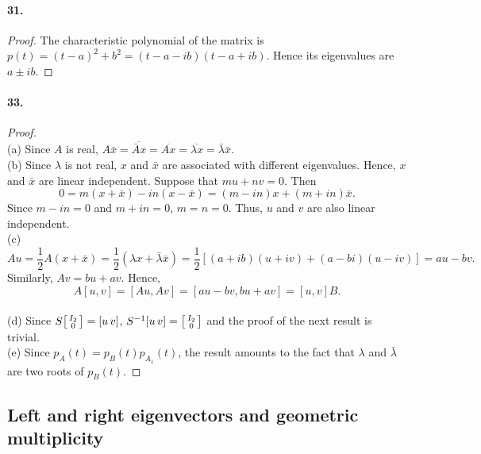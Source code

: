   \paragraph{31.}
  \begin{proof}
    The characteristic polynomial of the matrix is $p(t)=(t-a)^2+b^2=
    (t-a-ib)(t-a+ib)$. Hence its eigenvalues are $a\pm ib$.
  \end{proof}

  \paragraph{33.}
  \begin{proof}
    $\,$\\
    (a) Since $A$ is real, $A\bar{x} = \overline{\bar{A}x} = \overline{Ax} = 
    \overline{\lambda x} = \bar{\lambda}\bar{x}$.\\
    (b) Since $\lambda$ is not real, $x$ and $\bar{x}$ are associated with
    different eigenvalues. Hence, $x$ and $\bar{x}$ are linear independent.
    Suppose that $mu+nv=0$. Then
    \[
      0= m(x+\bar{x})-in(x-\bar{x}) = (m-in)x + (m+in)\bar{x}.
    \]
    Since $m-in=0$ and $m+in=0$, $m=n=0$. Thus, $u$ and $v$ are also linear 
    independent.\\
    (c) 
    \[
      Au = \frac{1}{2}A(x+\bar{x})=\frac{1}{2}(\lambda x+\bar{\lambda}\bar{x})
      = \frac{1}{2}[(a+ib)(u+iv)+(a-bi)(u-iv)] = au-bv.
    \]
    Similarly, $Av=bu+av$. Hence,
    \[
      A[u, v] = [Au, Av] = [au-bv, bu+av] = [u, v]B.
    \]\\
    (d) Since $S\begin{bsmallmatrix} I_2 \\ 0 \end{bsmallmatrix} = [u\,v]$, 
    $S^{-1}[u\,v]=\begin{bsmallmatrix} I_2 \\ 0 \end{bsmallmatrix}$ and the proof
    of the next result is trivial. \\
    (e) Since $p_A(t) = p_B(t)p_{A_1}(t)$, the result amounts to the fact that
    $\lambda$ and $\bar{\lambda}$ are two roots of $p_B(t)$.
  \end{proof}
  


\subsection{Left and right eigenvectors and geometric multiplicity}
